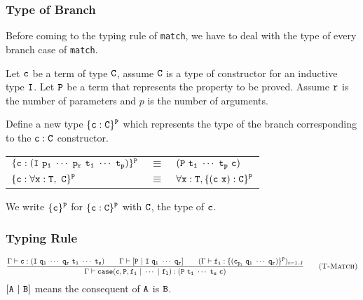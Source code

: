 \subsubsection{Type of Branch}
Before coming to the typing rule of {\tt match}, we have to deal with the type of every branch case of {\tt match}.\par
Let $\tt c$ be a term of type $\tt C$, assume $\tt C$ is a type of constructor for an inductive type $\tt I$. Let
$\tt P$ be a term that represents the property to be proved. Assume $\tt r$ is the number of parameters and 
$p$ is the number of arguments.\par
Define a new type $\tt \{c:C\}^P$ which represents the type of the branch corresponding to the $\tt c:C$ constructor.
\begin{center}
\begin{tabular}{lcl}
$\tt \{c:(I\ p_1\ \cdots\ p_r\ t_1\ \cdots\ t_p)\}^P$ & $\equiv$ & $\tt (P\ t_1\ \cdots\ t_p\ c)$\\
$\tt \{c:\forall x:T,\ C\}^P$ & $\equiv$ & $\tt \forall x:T, \{(c\ x):C\}^P$
\end{tabular}
\end{center}
We write $\tt\{c\}^P$ for $\tt\{c:C\}^P$ with $\tt C$, the type of $\tt c$.

\subsubsection{Typing Rule}
\begin{equation*}
\frac{\Gamma\vdash{\tt c:(I\ q_1\ \cdots\ q_r\ t_1\ \cdots\ t_s)}\qquad 
        \Gamma\vdash{\tt [P\ |\ I\ q_1\ \cdots\ q_r]}\qquad
    (\Gamma\vdash{\tt f_i:\{(c_{p_i}\ q_1\ \cdots\ q_r)\}^P})_{i=1..l}}
    {\Gamma\vdash{\tt case(c,P,f_1\ |\ \cdots\ |\ f_l):(P\ t_1\ \cdots\ t_s\ c)}}
    \tag{\sc T-Match}
\end{equation*}
$\tt [A\ |\ B]$ means the consequent of $\tt A$ is $\tt B$.
